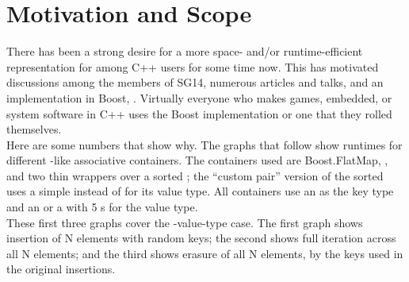 \section{Motivation and Scope}

There has been a strong desire for a more space- and/or runtime-efficient
representation for  among C++ users for some time now.  This has
motivated discussions among the members of SG14, numerous articles and talks,
and an implementation in Boost, .  Virtually
everyone who makes games, embedded, or system software in C++ uses the Boost
implementation or one that they rolled themselves.\\

Here are some numbers that show why.  The graphs that follow show runtimes for
different -like associative containers.  The containers used are
Boost.FlatMap, , and two thin wrappers over a sorted
; the ``custom pair'' version of the sorted
 uses a simple  instead of  for
its value type.  All containers use an  as the key type and an
 or a  with 5 s for the value type.\\

These first three graphs cover the -value-type case.  The first
graph shows insertion of N elements with random keys; the second shows full
iteration across all N elements; and the third shows erasure of all N
elements, by the keys used in the original insertions.

